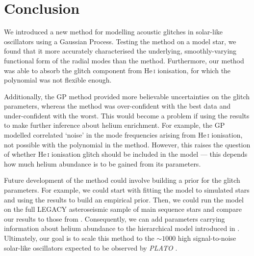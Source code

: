 
\section{Conclusion}

We introduced a new method for modelling acoustic glitches in solar-like oscillators using a Gaussian Process. Testing the method on a model star, we found that it more accurately characterised the underlying, smoothly-varying functional form of the radial modes than the 
 method. Furthermore, our method was able to absorb the glitch component from He\,\textsc{i} ionisation, for which the polynomial was not flexible enough.

Additionally, the GP method provided more believable uncertainties on the glitch parameters, whereas the  method was over-confident with the best data and under-confident with the worst. This would become a problem if using the results to make further inference about helium enrichment. For example, the GP modelled correlated `noise' in the mode frequencies arising from He\,\textsc{i} ionisation, not possible with the polynomial in the  method. However, this raises the question of whether He\,\textsc{i} ionisation glitch should be included in the model --- this depends how much helium abundance is to be gained from its parameters.

Future development of the method could involve building a prior for the glitch parameters. For example, we could start with fitting the model to simulated stars and using the results to build an empirical prior. Then, we could run the model on the full LEGACY asteroseismic sample of main sequence stars \citep{Lund.SilvaAguirre.ea2017} and compare our results to those from \citet{Verma.Raodeo.ea2019}. Consequently, we can add parameters carrying information about helium abundance to the hierarchical model introduced in \citet{Lyttle.Davies.ea2021}. Ultimately, our goal is to scale this method to the \(\sim \num{1000}\) high signal-to-noise solar-like oscillators expected to be observed by \emph{PLATO} \citep{Rauer.Catala.ea2014}.
